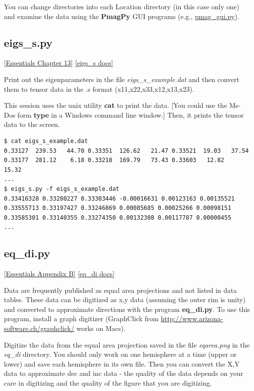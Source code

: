 \documentclass[11pt]{book}
\begin{document}
{{{You can change directories into each Location directory (in this case only one) and examine the data using the {\bf PmagPy} GUI programs (e.g., \href{#pmag_gui.py}{pmag\_gui.py}).


\subsection{eigs\_s.py}
\href{http://earthref.org/MAGIC/books/Tauxe/Essentials/WebBook3ch13.html#ch13}{ [Essentials Chapter 13]}
\href{https://github.com/PmagPy/PmagPy/blob/master/programs/eigs_s.py}{[eigs\_s docs]}

Print out the eigenparameters  in the file {\it eigs\_s\_example.dat} and then
convert them to tensor data in the .s format (x11,x22,x33,x12,x13,x23).

This session uses the unix utility {\bf cat} to print the data.  [You could use the Ms-Dos
form {\bf type} in a Windows command line window.]    Then, it prints the tensor data to the screen.

\begin{verbatim}
$ cat eigs_s_example.dat
0.33127  239.53   44.70 0.33351  126.62   21.47 0.33521  19.03   37.54
0.33177  281.12    6.18 0.33218  169.79   73.43 0.33603   12.82   15.32
...
$ eigs_s.py -f eigs_s_example.dat
0.33416328 0.33280227 0.33303446 -0.00016631 0.00123163 0.00135521
0.33555713 0.33197427 0.33246869 0.00085685 0.00025266 0.00098151
0.33585301 0.33140355 0.33274350 0.00132308 0.00117787 0.00000455
...
\end{verbatim}

\subsection{eq\_di.py}
\href{http://earthref.org/MAGIC/books/Tauxe/Essentials/WebBook3.html#equal_area}{[Essentials Appendix B]}
\href{https://github.com/PmagPy/PmagPy/blob/master/programs/eq_di.py}{[eq\_di docs]}

Data are frequently  published as equal area projections and not listed in data tables.  These data can be digitized as x,y data (assuming the outer rim is unity) and converted to approximate directions with the program {\bf eq\_di.py}.  To use this program, install a graph digitizer (GraphClick from \url{http://www.arizona-software.ch/graphclick/} works on Macs).

Digitize the data from the equal area projection saved in the file {\it eqarea.png} in the {\it eq\_di} directory.
You should only work on one hemisphere at a time (upper or lower) and save each hemisphere in its own file.  Then you can convert the X,Y data to approximate dec and inc data - the quality of the data depends on your care in digitizing and the quality of the figure that you are digitizing.

}}}
\end{document}
